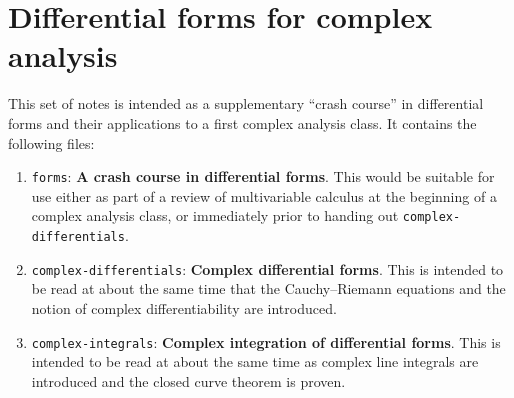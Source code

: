 \ifdefined\inmaster\else\def\subonly{\jobname}\fi

\addtocounter{chapter}{-1}
\chapter{Differential forms for complex analysis}

This set of notes is intended as a supplementary ``crash course'' in differential forms and their applications to a first complex analysis class.
It contains the following files:
\begin{enumerate}
\item \texttt{forms}: \textbf{A crash course in differential forms}.
  This would be suitable for use either as part of a review of multivariable calculus at the beginning of a complex analysis class, or immediately prior to handing out \texttt{complex-differentials}.
\item \texttt{complex-differentials}: \textbf{Complex differential forms}.
  This is intended to be read at about the same time that the Cauchy--Riemann equations and the notion of complex differentiability are introduced.
\item \texttt{complex-integrals}: \textbf{Complex integration of differential forms}.
  This is intended to be read at about the same time as complex line integrals are introduced and the closed curve theorem is proven.
\end{enumerate}
